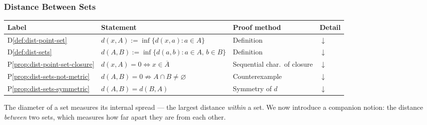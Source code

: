 %

\subsubsection{Distance Between Sets}
\label{sec:distance-between-sets}

\begin{tcolorbox}[colback=gray!6, colframe=gray!40, arc=2pt,
  left=6pt, right=6pt, top=4pt, bottom=4pt,
  title={\small\textbf{Distance Between Sets --- Quick Reference}},
  fonttitle=\small\bfseries]
\small
\begin{tabular}{l l l l}
\toprule
\textbf{Label} & \textbf{Statement} & \textbf{Proof method} & \textbf{Detail} \\
\midrule
D\ref{def:dist-point-set}
  & $d(x, A) := \inf\{d(x,a) : a \in A\}$
  & Definition
  & \hyperref[def:dist-point-set]{$\downarrow$} \\[4pt]
D\ref{def:dist-sets}
  & $d(A, B) := \inf\{d(a,b) : a \in A,\, b \in B\}$
  & Definition
  & \hyperref[def:dist-sets]{$\downarrow$} \\[4pt]
P\ref{prop:dist-point-set-closure}
  & $d(x, A) = 0 \iff x \in \overline{A}$
  & Sequential char.\ of closure
  & \hyperref[prop:dist-point-set-closure]{$\downarrow$} \\[4pt]
P\ref{prop:dist-sets-not-metric}
  & $d(A,B) = 0 \not\Rightarrow A \cap B \neq \varnothing$
  & Counterexample
  & \hyperref[prop:dist-sets-not-metric]{$\downarrow$} \\[4pt]
P\ref{prop:dist-sets-symmetric}
  & $d(A, B) = d(B, A)$
  & Symmetry of $d$
  & \hyperref[prop:dist-sets-symmetric]{$\downarrow$} \\[4pt]
\bottomrule
\end{tabular}
\end{tcolorbox}


The diameter of a set measures its internal spread --- the largest distance
\emph{within} a set.
We now introduce a companion notion: the distance \emph{between} two sets,
which measures how far apart they are from each other.

